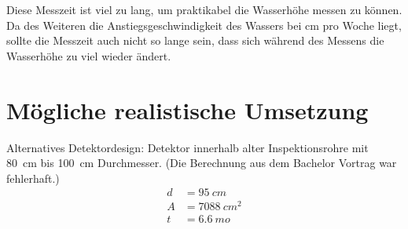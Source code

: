 \documentclass[
  tucolor,       %
  BCOR=12mm,     %
  parskip=half,  %
  open=any,      %
  cleardoublepage=plain,  %
]{tudothesis}
\begin{document}
Diese Messzeit ist viel zu lang, um praktikabel die Wasserhöhe messen zu können.
Da des Weiteren die Anstiegsgeschwindigkeit des Wassers bei \si[]{cm} pro Woche
liegt, sollte die Messzeit auch nicht so lange sein, dass sich während des Messens 
die Wasserhöhe zu viel wieder ändert.

\section{Mögliche realistische Umsetzung}

Alternatives Detektordesign: Detektor innerhalb alter Inspektionsrohre mit 
\SI[]{80}[]{cm} bis \SI[]{100}[]{cm} Durchmesser. 
(Die Berechnung aus dem Bachelor Vortrag war fehlerhaft.)
\begin{align*}
  d &= \SI[]{95}[]{cm} \\
  A &= \SI[]{7088}[]{cm^2} \\
  t &= \SI[]{6,6}[]{mo}
\end{align*}
\end{document}
